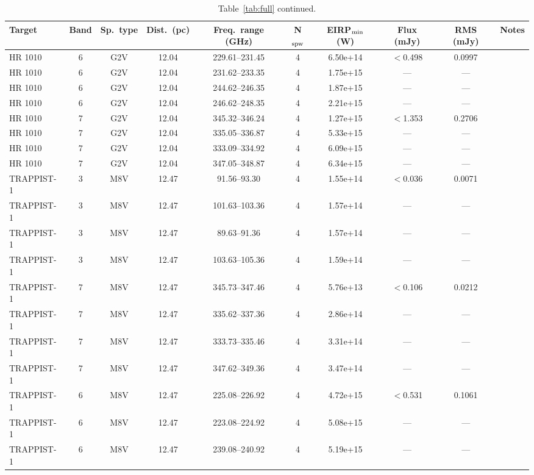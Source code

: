 \documentclass{openjournal}
\begin{document}
\begin{table}
\centering
\scriptsize
\caption{Table~\ref{tab:full} continued.}
\label{tab:full5}
\begin{tabularx}{\textwidth}{@{}l c c c c c c c c X@{}}
\hline
Target & Band & Sp.\ type & Dist.\ (pc) & Freq.\ range (GHz) & N$_{\rm spw}$ & EIRP$_{\rm min}$ (W) & Flux (mJy) & RMS (mJy) & Notes \\
\hline
HR 1010 & 6 & G2V & 12.04 & 229.61--231.45 & 4 & 6.50e+14 & $<$0.498 & 0.0997 &  \\
HR 1010 & 6 & G2V & 12.04 & 231.62--233.35 & 4 & 1.75e+15 & --- & --- &  \\
HR 1010 & 6 & G2V & 12.04 & 244.62--246.35 & 4 & 1.87e+15 & --- & --- &  \\
HR 1010 & 6 & G2V & 12.04 & 246.62--248.35 & 4 & 2.21e+15 & --- & --- &  \\
HR 1010 & 7 & G2V & 12.04 & 345.32--346.24 & 4 & 1.27e+15 & $<$1.353 & 0.2706 &  \\
HR 1010 & 7 & G2V & 12.04 & 335.05--336.87 & 4 & 5.33e+15 & --- & --- &  \\
HR 1010 & 7 & G2V & 12.04 & 333.09--334.92 & 4 & 6.09e+15 & --- & --- &  \\
HR 1010 & 7 & G2V & 12.04 & 347.05--348.87 & 4 & 6.34e+15 & --- & --- &  \\
TRAPPIST-1 & 3 & M8V & 12.47 & 91.56--93.30 & 4 & 1.55e+14 & $<$0.036 & 0.0071 &  \\
TRAPPIST-1 & 3 & M8V & 12.47 & 101.63--103.36 & 4 & 1.57e+14 & --- & --- &  \\
TRAPPIST-1 & 3 & M8V & 12.47 & 89.63--91.36 & 4 & 1.57e+14 & --- & --- &  \\
TRAPPIST-1 & 3 & M8V & 12.47 & 103.63--105.36 & 4 & 1.59e+14 & --- & --- &  \\
TRAPPIST-1 & 7 & M8V & 12.47 & 345.73--347.46 & 4 & 5.76e+13 & $<$0.106 & 0.0212 &  \\
TRAPPIST-1 & 7 & M8V & 12.47 & 335.62--337.36 & 4 & 2.86e+14 & --- & --- &  \\
TRAPPIST-1 & 7 & M8V & 12.47 & 333.73--335.46 & 4 & 3.31e+14 & --- & --- &  \\
TRAPPIST-1 & 7 & M8V & 12.47 & 347.62--349.36 & 4 & 3.47e+14 & --- & --- &  \\
TRAPPIST-1 & 6 & M8V & 12.47 & 225.08--226.92 & 4 & 4.72e+15 & $<$0.531 & 0.1061 &  \\
TRAPPIST-1 & 6 & M8V & 12.47 & 223.08--224.92 & 4 & 5.08e+15 & --- & --- &  \\
TRAPPIST-1 & 6 & M8V & 12.47 & 239.08--240.92 & 4 & 5.19e+15 & --- & --- &  \\

\end{tabularx}
\end{table}
\end{document}
